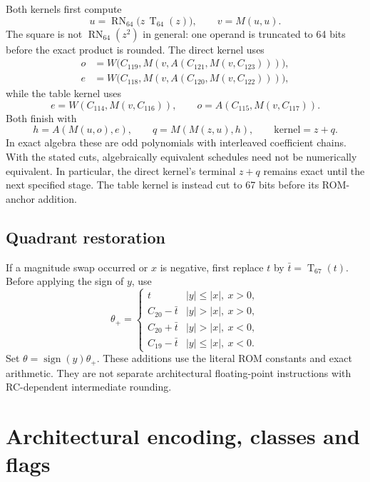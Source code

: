 \documentclass[11pt]{article}
\newcommand{\T}[1]{\operatorname{T}_{#1}}
\newcommand{\N}{\operatorname{RN}_{64}}
\begin{document}
Both kernels first compute
\begin{equation}
 u=\N\bigl(z\,\T{64}(z)\bigr),\qquad v=M(u,u).
 \label{eq:square}
\end{equation}
The square is not $\N(z^2)$ in general: one operand is truncated to 64 bits
before the exact product is rounded. The direct kernel uses
\begin{align}
 o&=W\bigl(C_{119},M(v,A(C_{121},M(v,C_{123})))\bigr),\\
 e&=W\bigl(C_{118},M(v,A(C_{120},M(v,C_{122})))\bigr),
\end{align}
while the table kernel uses
\begin{equation}
 e=W(C_{114},M(v,C_{116})),\qquad o=A(C_{115},M(v,C_{117})).
\end{equation}
Both finish with
\begin{equation}
 h=A(M(u,o),e),\qquad q=M(M(z,u),h),\qquad
 \mathrm{kernel}=z+q.
 \label{eq:terminal}
\end{equation}
In exact algebra these are odd polynomials with interleaved coefficient
chains. With the stated cuts, algebraically equivalent schedules need not
be numerically equivalent. In particular, the direct kernel's terminal
$z+q$ remains exact until the next specified stage. The table kernel is
instead cut to 67 bits before its ROM-anchor addition.

\subsection{Quadrant restoration}

If a magnitude swap occurred or $x$ is negative, first replace
$t$ by $\bar t=\T{67}(t)$. Before applying the sign of $y$, use
\begin{equation}
 \theta_+=
 \begin{cases}
  t & |y|\le|x|,\ x>0,\\
  C_{20}-\bar t & |y|>|x|,\ x>0,\\
  C_{20}+\bar t & |y|>|x|,\ x<0,\\
  C_{19}-\bar t & |y|\le|x|,\ x<0.
 \end{cases}
\end{equation}
Set $\theta=\operatorname{sign}(y)\theta_+$. These additions use the literal
ROM constants and exact arithmetic. They are not separate architectural
floating-point instructions with RC-dependent intermediate rounding.

\section{Architectural encoding, classes and flags}
\label{sec:architecture}
\end{document}

